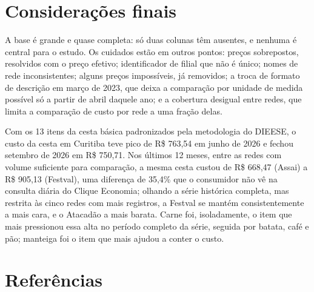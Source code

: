 \documentclass[11pt,a4paper]{article}
\begin{document}
\section{Considerações finais}

A base é grande e quase completa: só duas colunas têm ausentes, e nenhuma é central para o estudo. Os cuidados estão em outros pontos: preços sobrepostos, resolvidos com o preço efetivo; identificador de filial que não é único; nomes de rede inconsistentes; alguns preços impossíveis, já removidos; a troca de formato de descrição em março de 2023, que deixa a comparação por unidade de medida possível só a partir de abril daquele ano; e a cobertura desigual entre redes, que limita a comparação de custo por rede a uma fração delas.

Com os 13 itens da cesta básica padronizados pela metodologia do DIEESE, o custo da cesta em Curitiba teve pico de R\$ 763,54 em junho de 2026 e fechou setembro de 2026 em R\$ 750,71. Nos últimos 12 meses, entre as redes com volume suficiente para comparação, a mesma cesta custou de R\$ 668,47 (Assai) a R\$ 905,13 (Festval), uma diferença de 35,4\% que o consumidor não vê na consulta diária do Clique Economia; olhando a série histórica completa, mas restrita às cinco redes com mais registros, a Festval se mantém consistentemente a mais cara, e o Atacadão a mais barata. Carne foi, isoladamente, o item que mais pressionou essa alta no período completo da série, seguida por batata, café e pão; manteiga foi o item que mais ajudou a conter o custo.

\section*{Referências}
\end{document}

